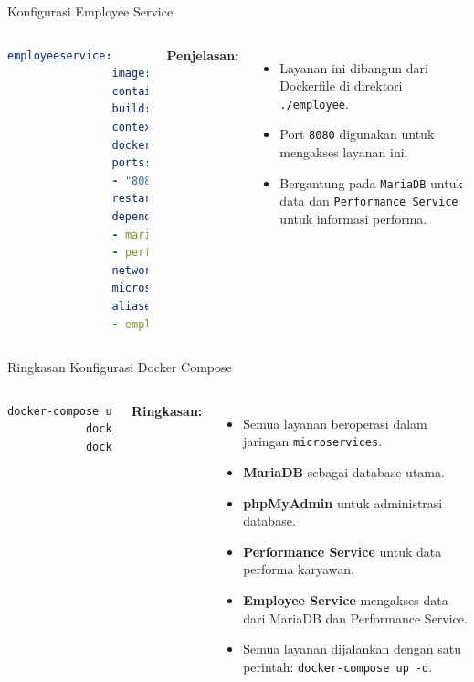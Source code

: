 \documentclass[aspectratio=169, table]{beamer}
\begin{document}
\begin{frame}[fragile]{Konfigurasi Employee Service}
	\vspace{20pt}
	\begin{columns}
		\begin{lstlisting}[language=yaml]
			employeeservice:                        
				image: employee-service               
				container_name: employee-service-app 
				build:
				context: ./employee                        
				dockerfile: Dockerfile              
				ports:
				- "8080:8080"                       
				restart: always
				depends_on:                           
				- mariadb
				- performanceservice
				networks:
				microservices:
				aliases:
				- employeeservice
		\end{lstlisting}
		
		\textbf{Penjelasan:}
		\begin{itemize}
			\item Layanan ini dibangun dari Dockerfile di direktori \texttt{./employee}.
			\item Port \texttt{8080} digunakan untuk mengakses layanan ini.
			\item Bergantung pada \texttt{MariaDB} untuk data dan \texttt{Performance Service} untuk informasi performa.
		\end{itemize}
	\end{columns}
\end{frame}

\begin{frame}[fragile]{Ringkasan Konfigurasi Docker Compose}
	\vspace{20pt}
	\begin{columns}
		\column{0.40\textwidth}
		\begin{lstlisting}[language=bash]
			docker-compose up -d
			docker-compose ps
			docker-compose down
		\end{lstlisting}
		
		\column{0.6\textwidth}
		\textbf{Ringkasan:}
		\begin{itemize}
			\item Semua layanan beroperasi dalam jaringan \texttt{microservices}.
			\item \textbf{MariaDB} sebagai database utama.
			\item \textbf{phpMyAdmin} untuk administrasi database.
			\item \textbf{Performance Service} untuk data performa karyawan.
			\item \textbf{Employee Service} mengakses data dari MariaDB dan Performance Service.
			\item Semua layanan dijalankan dengan satu perintah: \texttt{docker-compose up -d}.
		\end{itemize}
	\end{columns}
\end{frame}
\end{document}
